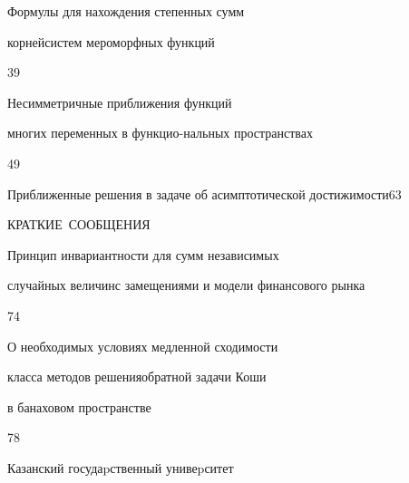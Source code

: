 {Формулы для нахождения степенных сумм 


корней\newline систем мероморфных функций}{39}




{Несимметричные приближения функций 


многих переменных в функцио-\newline нальных пространствах}{49}






{Приближенные решения в задаче об асимптотической достижимости}{63}





\bigskip





\centerline{\Large КРАТКИЕ~СООБЩЕНИЯ}


\bigskip







{Принцип инвариантности для сумм  независимых 


случайных величин\newline с замещениями и модели финансового рынка}{74}




{О необходимых условиях медленной сходимости


класса методов решения\newline обратной задачи Коши 


в банаховом пространстве}{78}








\vfill


\noindent\raisebox{2pt}{\copyright} Казанский госудаpственный унивеpситет





